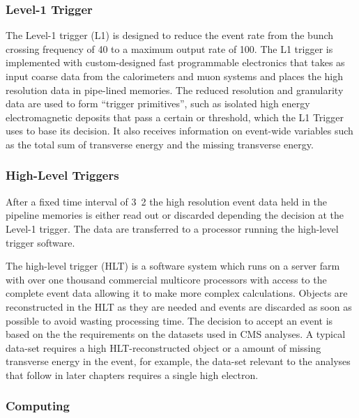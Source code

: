 \subsubsection{Level-1 Trigger}

The Level-1 trigger (L1) is designed to reduce the event rate from the bunch
crossing frequency of \unit{40}{\mega\hertz} to a maximum output rate of
\unit{100}{\kilo\hertz}.
The L1 trigger is implemented with custom-designed fast programmable electronics
 that takes as input coarse data from the calorimeters and muon systems and
places the high resolution data in pipe-lined memories. The reduced resolution
and granularity data are used to form ``trigger primitives'', such as isolated
high energy electromagnetic deposits that pass a certain \PT or \ET threshold,
which the L1 Trigger uses to base its decision. It also receives information on
event-wide variables such as the total sum of transverse energy and the missing
transverse energy.

\subsubsection{High-Level Triggers}
After a fixed time interval of \unit{3.2}{\micro\second} the high resolution
event data held in the pipeline memories is either read out or discarded
depending the decision at the Level-1 trigger.  The data are transferred to a
processor running the high-level trigger software.

The high-level trigger (HLT) is a software system which runs on a server farm
with over one thousand commercial multicore processors with access to the
complete event data allowing it to make more complex calculations. 
Objects are reconstructed in the HLT as they are needed and events are discarded
as soon as possible to avoid wasting processing time.
The decision to accept an event is based on the the requirements on the datasets
used in {CMS} analyses. A typical data-set requires a high \pT
HLT-reconstructed object or a amount of missing transverse energy in the event,
for example, the data-set relevant to the analyses that follow in later chapters
requires a single high \pT electron.

\subsubsection{Computing}

